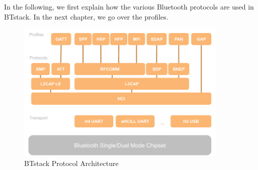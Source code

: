 In the following, we first explain how the various Bluetooth protocols are used in BTstack. In the next chapter, we go over the profiles.																			

\begin{figure}[htbp] %
   \centering
   \includegraphics[width=0.9\textwidth]{picts/btstack-protocols.pdf} 
   \caption{BTstack Protocol Architecture}
   \label{fig:BTstackProtocolArchitecture}
\end{figure}


